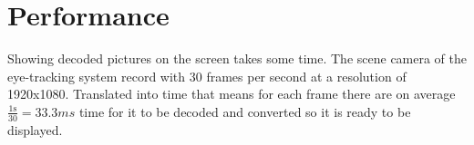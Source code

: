\chapter{Performance}
\label{chap:performance}
Showing decoded pictures on the screen takes some time. The scene camera of the eye-tracking system record with 30 frames per second at a resolution of 1920x1080. Translated into time that means for each frame there are on average $\displaystyle\frac{\mbox{1s}}{\mbox{30}}=33.3ms$ time for it to be decoded and converted so it is ready to be displayed. 



